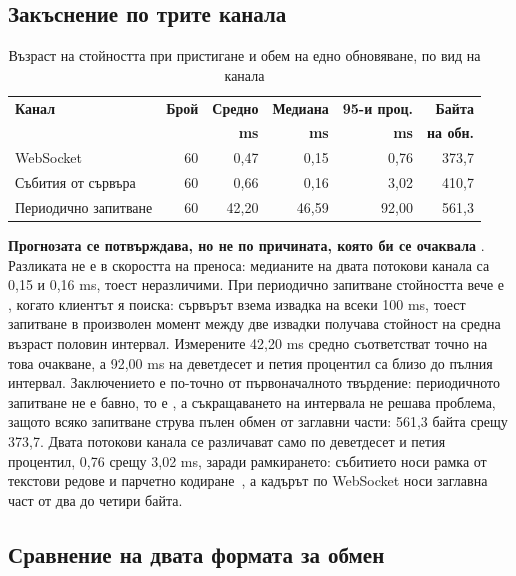 \subsection{Закъснение по трите канала}

\begin{table}[H]
\caption{Възраст на стойността при пристигане и обем на едно обновяване, по вид на канала}
\label{tab:latency}
\centering
\fontsize{11}{13.2}\selectfont
\begin{tabular}{@{}L{4.2cm}rrrrr@{}}
\toprule
\textbf{Канал} & \textbf{Брой} & \textbf{Средно} & \textbf{Медиана} & \textbf{95-и проц.} & \textbf{Байта} \\
 & & \textbf{ms} & \textbf{ms} & \textbf{ms} & \textbf{на обн.} \\
\midrule
WebSocket             & 60 & 0,47  & 0,15  & 0,76  & 373,7 \\
Събития от сървъра    & 60 & 0,66  & 0,16  & 3,02  & 410,7 \\
Периодично запитване  & 60 & 42,20 & 46,59 & 92,00 & 561,3 \\
\bottomrule
\end{tabular}
\end{table}

\textbf{Прогнозата се потвърждава, но не по причината, която би се очаквала}
. Разликата не е в скоростта на преноса: медианите на двата потокови
канала са 0,15 и 0,16 ms, тоест неразличими. При периодично запитване стойността вече е
, когато клиентът я поиска: сървърът взема извадка на всеки 100 ms, тоест
запитване в произволен момент между две извадки получава стойност на средна възраст половин
интервал. Измерените 42,20 ms средно съответстват точно на това очакване, а 92,00 ms на
деветдесет и петия процентил са близо до пълния интервал. Заключението е по-точно от
първоначалното твърдение: периодичното запитване не е бавно, то е , а
съкращаването на интервала не решава проблема, защото всяко запитване струва пълен обмен от
заглавни части: 561,3 байта срещу 373,7. Двата потокови канала се различават само по
деветдесет и петия процентил, 0,76 срещу 3,02 ms, заради рамкирането: събитието носи рамка от
текстови редове и парчетно кодиране~\cite{rfc9112}, а кадърът по WebSocket носи заглавна част
от два до четири байта.

\subsection{Сравнение на двата формата за обмен}

